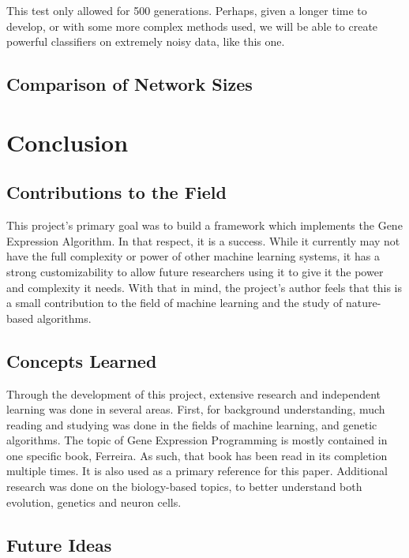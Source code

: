 \documentclass[a4paper,11pt]{report}
\begin{document}
This test only allowed for 500 generations. Perhaps, given a longer time to develop, or with some more complex 
methods used, we will be able to create powerful classifiers on extremely noisy data, like this one. 

\section{Comparison of Network Sizes}









\chapter{Conclusion}

\section{Contributions to the Field}

This project's primary goal was to build a framework which implements the Gene Expression Algorithm. 
In that respect, it is a success. While it currently may not have the full complexity or power of 
other machine learning systems, it has a strong customizability to allow future researchers using it
to give it the power and complexity it needs. With that in mind, the project's author feels that 
this is a small contribution to the field of machine learning and the study of nature-based algorithms. 

\section{Concepts Learned}

Through the development of this project, extensive research and independent learning was done in 
several areas. First, for background understanding, much reading and studying was done in the 
fields of machine learning, and genetic algorithms. The topic of Gene Expression Programming 
is mostly contained in one specific book, 
Ferreira. %
As such, that book has been read in its completion multiple times. It is also used as a primary 
reference for this paper. Additional research was done on the biology-based topics, to better 
understand both evolution, genetics and neuron cells. 

\section{Future Ideas}
\end{document}
